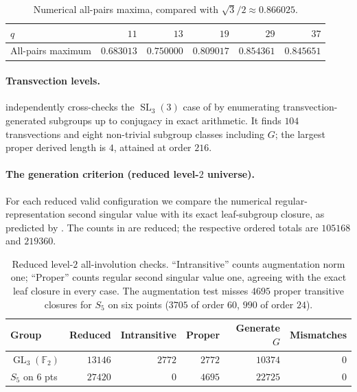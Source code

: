 \documentclass[11pt]{amsart}
\theoremstyle{definition}
\theoremstyle{remark}
\theoremstyle{plain}
\theoremstyle{plain}
\numberwithin{equation}{section}
\DeclareMathOperator{\GL}{GL}
\DeclareMathOperator{\SL}{SL}
\newcommand{\F}{\mathbb{F}}
\begin{document}
\begin{table}[htbp]
\centering\small
\begin{tabular}{lrrrrr}
\toprule
$q$ & $11$ & $13$ & $19$ & $29$ & $37$ \\
\midrule
All-pairs maximum & $0.683013$ & $0.750000$ & $0.809017$ & $0.854361$ & $0.845651$ \\
\bottomrule
\end{tabular}
\smallskip
\caption{Numerical all-pairs maxima, compared with $\sqrt3/2\approx0.866025$.}
\label{tab:allpairs-evidence}
\end{table}

\paragraph{Transvection levels.}
 independently cross-checks the
$\SL_3(3)$ case of  by enumerating
transvection-generated subgroups up to conjugacy in exact arithmetic.
It finds $104$ transvections and eight non-trivial subgroup classes including $G$;
the largest proper derived length is $4$, attained at order $216$.

\paragraph{The generation criterion (reduced level-$2$ universe).}
For each reduced valid configuration we compare the numerical regular-representation
second singular value with its exact leaf-subgroup closure, as predicted by
. The counts in  are reduced; the respective
ordered totals are $105168$ and $219360$.

\begin{table}[t]
\centering\small
\begin{tabular}{lrrrrr}
\toprule
Group & Reduced & Intransitive & Proper & Generate $G$ & Mismatches \\
\midrule
$\GL_3(\F_2)$ & $13146$ & $2772$ & $2772$ & $10374$ & $0$ \\
$S_5$ on $6$ pts & $27420$ & $0$ & $4695$ & $22725$ & $0$ \\
\bottomrule
\end{tabular}
\smallskip
\caption{Reduced level-$2$ all-involution checks. ``Intransitive'' counts augmentation norm one;
``Proper'' counts regular second singular value one, agreeing with the exact leaf
closure in every case. The augmentation test misses $4695$ proper transitive
closures for $S_5$ on six points ($3705$ of order $60$, $990$ of order $24$).}
\label{tab:criterion}
\end{table}
\end{document}
